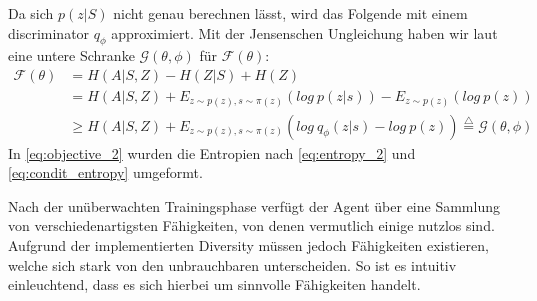 Da sich $ p(z|S) $ nicht genau berechnen lässt, wird das Folgende mit einem discriminator $ q_\phi $ approximiert. Mit der Jensenschen Ungleichung haben wir laut \cite{diversity_eysenbach} eine untere Schranke $ \mathcal{G}(\theta, \phi) $ für $ \mathcal{F}(\theta) $:
\begin{align}
    \mathcal{F}(\theta) & = H(A|S,Z) - H(Z|S) + H(Z) \nonumber\\
    & = H(A|S,Z) + E_{z \sim p(z), s \sim \pi(z)}(log\ p(z | s)) - E_{z \sim p(z)}(log\ p(z)) \label{eq:objective_2}\\
    & \ge H(A|S,Z) + E_{z \sim p(z), s \sim \pi(z)}(log\ q_\phi(z | s) - log\ p(z)) \stackrel{\triangle}{=} \mathcal{G}(\theta, \phi) \nonumber
\end{align}
In \eqref{eq:objective_2} wurden die Entropien nach \eqref{eq:entropy_2} und \eqref{eq:condit_entropy} umgeformt.

\smallspace

Nach der unüberwachten Trainingsphase verfügt der Agent über eine Sammlung von verschiedenartigsten Fähigkeiten, von denen vermutlich einige nutzlos sind. Aufgrund der implementierten Diversity müssen jedoch Fähigkeiten existieren, welche sich stark von den unbrauchbaren unterscheiden. So ist es intuitiv einleuchtend, dass es sich hierbei um sinnvolle Fähigkeiten handelt.

